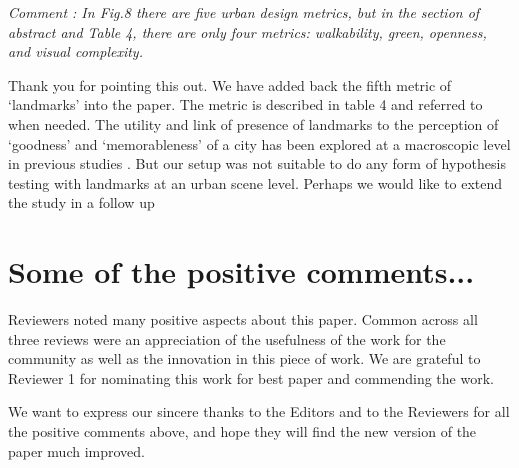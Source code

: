 \documentclass{paper}
\newenvironment{myquote}
{\definecolor{shadecolor}{rgb}{0.9,0.95,1} \begin{shaded*} \sf \em}
{\em\end{shaded*}}
\begin{document}
\begin{myquote}
\noindent Comment : In Fig.8 there are five urban design metrics, but in the section of abstract and Table 4, there are only four metrics: walkability, green, openness, and visual complexity. 
\end{myquote}

\noindent %
  
Thank you for pointing this out. We have added back the fifth metric of `landmarks' into the paper. The metric is described in table 4 and referred to when needed. The utility and link of presence of landmarks to the perception of `goodness' and `memorableness' of a city has been explored at a macroscopic level in previous studies \cite{quercia2014aesthetic,lynch1960image}. But our setup was not suitable to do any form of hypothesis testing with landmarks at an urban scene level. Perhaps we would like to extend the study in a follow up

\section*{Some of the positive comments...}

\begin{myquote}

\noindent Reviewers noted many positive aspects about this paper. Common across all three reviews were an appreciation of the usefulness of the work for the community as well as the innovation in this piece of work. We are grateful to Reviewer 1 for nominating this work for best paper and commending the work.  


\end{myquote}

We want to express our sincere thanks to the Editors and to the Reviewers for all the positive comments above, and hope they will find the new version of the paper much improved.


\end{document}

